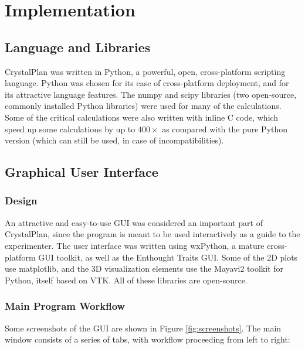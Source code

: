 \documentclass{iucr}              %
\begin{document}
\section{Implementation}


\subsection{Language and Libraries}

CrystalPlan was written in Python, a powerful, open, cross-platform scripting
language. Python was chosen for its ease of cross-platform deployment, and for
its attractive language features. The numpy and scipy libraries (two
open-source, commonly installed Python libraries) were used for many of the
calculations. Some of the critical calculations were also written with inline C
code, which speed up some calculations by up to $400\times$ as compared with
the pure Python version (which can still be used, in case of incompatibilities).       


\subsection{Graphical User Interface}

\subsubsection{Design}

An attractive and easy-to-use GUI was considered an important part of
CrystalPlan, since the program is meant to be used interactively as a guide to
the experimenter. The user interface was written using wxPython, a mature
cross-platform GUI toolkit, as well as the Enthought Traits GUI. Some of the 2D
plots use matplotlib, and the 3D visualization elements use the Mayavi2 toolkit
for Python, itself based on VTK. All of these libraries are open-source.       

\subsubsection{Main Program Workflow}
Some screenshots of the GUI are shown in Figure \ref{fig:screenshots}. The main
window consists of a series of tabs, with workflow proceeding from left to right:  
\end{document}
